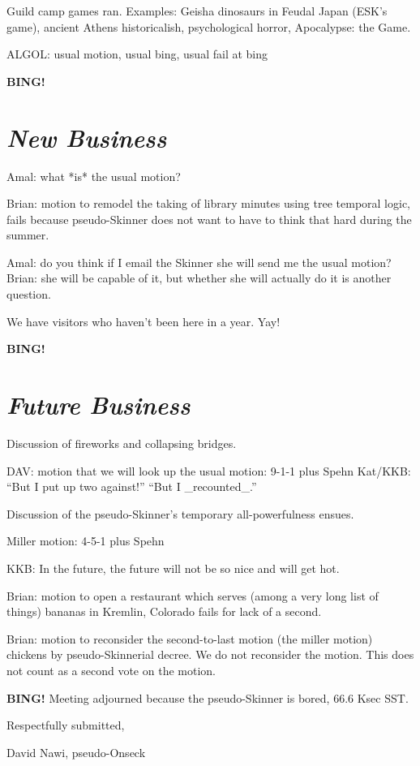 \documentclass[10pt]{article}
\newcommand{\bing}{{\bf BING!} }
\newcommand{\goto}[1]{\bing \vskip 12pt \section*{{\em{#1}}}}
\newcommand{\ps}{ plus Spehn\xspace}
\begin{document}
Guild camp games ran.
Examples: Geisha dinosaurs in Feudal Japan (ESK's game), ancient Athens historicalish, psychological horror, Apocalypse: the Game.

ALGOL: usual motion, usual bing, usual fail at bing

\goto{New Business}

Amal: what *is* the usual motion?

Brian: motion to remodel the taking of library minutes using tree temporal logic, fails because pseudo-Skinner does not want to have to think that hard during the summer.

Amal: do you think if I email the Skinner she will send me the usual motion?
Brian: she will be capable of it, but whether she will actually do it is another question.

We have visitors who haven't been here in a year.  Yay!

\goto{Future Business}

Discussion of fireworks and collapsing bridges.

DAV: motion that we will look up the usual motion: 9-1-1 \ps
Kat/KKB: ``But I put up two against!''  ``But I _recounted_.''

Discussion of the pseudo-Skinner's temporary all-powerfulness ensues.

Miller motion: 4-5-1 \ps

KKB: In the future, the future will not be so nice and will get hot.

Brian: motion to open a restaurant which serves (among a very long list of things) bananas in Kremlin, Colorado fails for lack of a second.

Brian: motion to reconsider the second-to-last motion (the miller motion) chickens by pseudo-Skinnerial decree.  We do not reconsider the motion.  This does not count as a second vote on the motion.

\bing
\noindent
Meeting adjourned because the pseudo-Skinner is bored, 66.6 Ksec SST.

\vspace{18pt}

\centerline{Respectfully submitted,}
\centerline{David Nawi, pseudo-Onseck}
\end{document}
